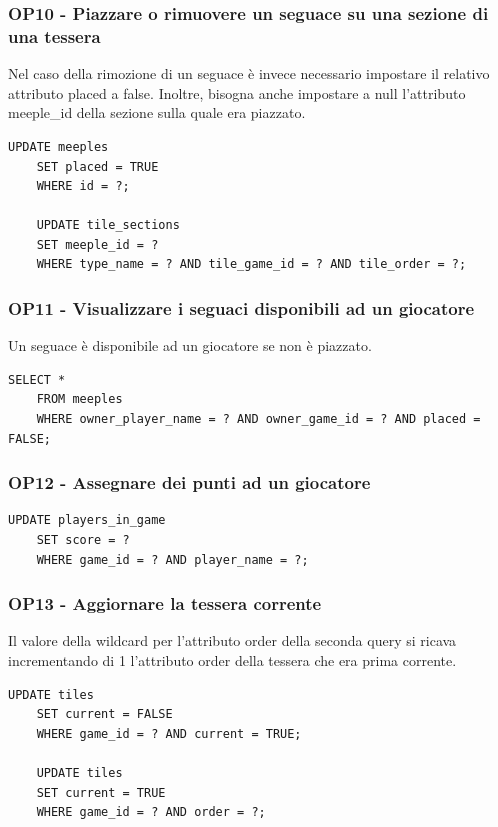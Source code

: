 \subsubsection*{OP10 - Piazzare o rimuovere un seguace su una sezione di una tessera}
Nel caso della rimozione di un seguace è invece necessario impostare il relativo attributo placed a false. Inoltre, bisogna anche impostare a null l'attributo meeple\_id della sezione sulla quale era piazzato.
\medskip

\begin{lstlisting}[style=sql]
    UPDATE meeples
    SET placed = TRUE
    WHERE id = ?;

    UPDATE tile_sections
    SET meeple_id = ?
    WHERE type_name = ? AND tile_game_id = ? AND tile_order = ?;
\end{lstlisting}

\subsubsection*{OP11 - Visualizzare i seguaci disponibili ad un giocatore}
Un seguace è disponibile ad un giocatore se non è piazzato.
\medskip

\begin{lstlisting}[style=sql]
    SELECT *
    FROM meeples
    WHERE owner_player_name = ? AND owner_game_id = ? AND placed = FALSE;
\end{lstlisting}

\subsubsection*{OP12 - Assegnare dei punti ad un giocatore}
\begin{lstlisting}[style=sql]
    UPDATE players_in_game
    SET score = ?
    WHERE game_id = ? AND player_name = ?;
\end{lstlisting}

\subsubsection*{OP13 - Aggiornare la tessera corrente}
Il valore della wildcard per l'attributo order della seconda query si ricava incrementando di 1 l'attributo order della tessera che era prima corrente.
\medskip

\begin{lstlisting}[style=sql]
    UPDATE tiles
    SET current = FALSE
    WHERE game_id = ? AND current = TRUE;

    UPDATE tiles
    SET current = TRUE
    WHERE game_id = ? AND order = ?;
\end{lstlisting}

